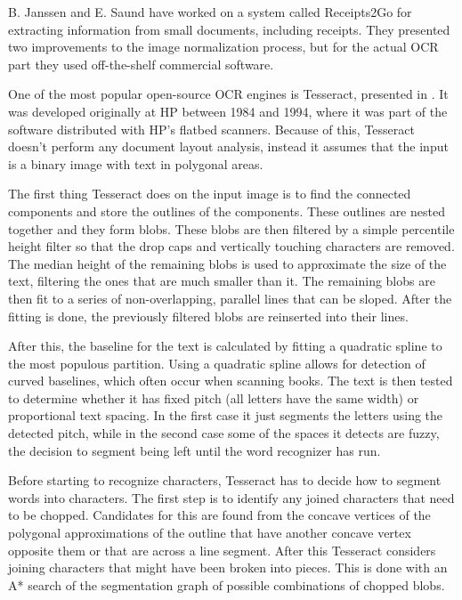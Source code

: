 B. Janssen and E. Saund have worked on a system called Receipts2Go \cite{janssen2012receipts2go} for extracting information from small documents, including receipts. They presented two improvements to the image normalization process, but for the actual OCR part they used off-the-shelf commercial software. 

One of the most popular open-source OCR engines is Tesseract, presented in  \cite{smith2007overview}. It was developed originally at HP between 1984 and 1994, where it was part of the software distributed with HP's flatbed scanners. Because of this, Tesseract doesn't perform any document layout analysis, instead it assumes that the input is a binary image with text in polygonal areas. 

The first thing Tesseract does on the input image is to find the connected components and store the outlines of the components. These outlines are nested together and they form blobs. These blobs are then filtered by a simple percentile height filter so that the drop caps and vertically touching characters are removed. The median height of the remaining blobs is used to approximate the size of the text, filtering the ones that are much smaller than it. The remaining blobs are then fit to a series of non-overlapping, parallel lines that can be sloped. After the fitting is done, the previously filtered blobs are reinserted into their lines. 

After this, the baseline for the text is calculated by fitting a quadratic spline to the most populous partition. Using a quadratic spline allows for detection of curved baselines, which often occur when scanning books. The text is then tested to determine whether it has fixed pitch (all letters have the same width) or proportional text spacing. In the first case it just segments the letters using the detected pitch, while in the second case some of the spaces it detects are fuzzy, the decision to segment being left until the word recognizer has run. 

Before starting to recognize characters, Tesseract has to decide how to segment words into characters. The first step is to identify any joined characters that need to be chopped. Candidates for this are found from the concave vertices of the polygonal approximations of the outline that have another concave vertex opposite them or that are across a line segment. After this Tesseract considers joining characters that might have been broken into pieces. This is  done with an A* search of the segmentation graph of possible combinations of chopped blobs. 


